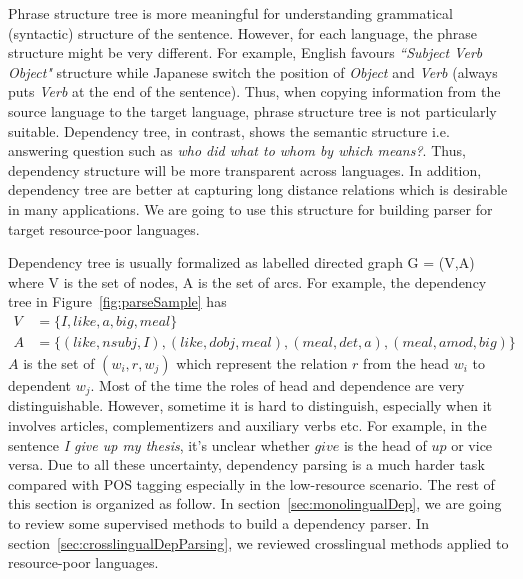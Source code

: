\documentclass[12pt,twoside,final,hidelinks]{ltthesis}
\theoremstyle{definition}
\begin{document}
Phrase structure tree is more meaningful for understanding grammatical (syntactic) structure of the sentence. However, for each language, the phrase structure might be very different. For example, English favours \textit{``Subject Verb Object"} structure while Japanese switch the position of \textit{Object} and \textit{Verb} (always puts \textit{Verb} at the end of the sentence). Thus, when copying information from the source language to the target language, phrase structure tree is not particularly suitable. Dependency tree, in contrast, shows the semantic structure i.e. answering question such as \textit{who did what to whom by which means?}. Thus, dependency structure will be more transparent across languages. In addition, dependency tree are better at capturing long distance relations which is desirable in many applications.  
We are going to use this structure for building parser for target resource-poor languages.

Dependency tree is usually formalized as labelled directed graph G = (V,A) where V is the set of nodes, A is the set of arcs. For example, the dependency tree in Figure~\ref{fig:parseSample} has 
\begin{align}
V &= \{I, like, a, big, meal\}\\
A &= \{(like, nsubj, I), (like, dobj, meal), (meal, det, a), (meal, amod, big)\} 
\end{align}
$A$ is the set of $(w_i,r,w_j)$ which represent the relation $r$ from the head $w_i$ to dependent $w_j$.%
Most of the time the roles of head and dependence are very distinguishable. However, sometime it is hard to distinguish, especially when it involves articles, complementizers and auxiliary verbs etc. For example, in the sentence \textit{I give up my thesis}, it's unclear whether $give$ is the head of $up$ or vice versa. Due to all these uncertainty, dependency parsing is a much harder task compared with POS tagging especially in the low-resource scenario. 
The rest of this section is organized as follow. In section~\ref{sec:monolingualDep}, we are going to review some supervised methods to build a dependency parser. In section~\ref{sec:crosslingualDepParsing}, we reviewed crosslingual methods applied to resource-poor languages. 
\end{document}

